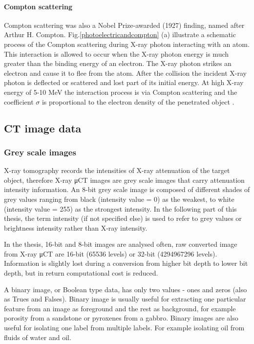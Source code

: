 \paragraph{Compton scattering}
Compton scattering was also a Nobel Prize-awarded (1927) finding, named after Arthur H. Compton. Fig.\ref{photoelectricandcompton} (a) illustrate a schematic process of the Compton scattering during X-ray photon interacting with an atom. This interaction is allowed to occur when the X-ray photon energy is much greater than the binding energy of an electron. The X-ray photon strikes an electron and cause it to flee from the atom. After the collision the incident X-ray photon is deflected or scattered and lost part of its initial energy. At high X-ray energy of 5-10 MeV the interaction process is via Compton scattering and the coefficient $\sigma$ is proportional to the electron density of the penetrated object \citep{wildenschild2013x, hsieh2003computed}. 

\subsection{CT image data}
\subsubsection{Grey scale images}
X-ray tomography records the intensities of X-ray attenuation of the target object, therefore X-ray μCT images are grey scale images that carry attenuation intensity information. An 8-bit grey scale image is composed of different shades of grey values ranging from black (intensity value = 0) as the weakest, to white (intensity value = 255) as the strongest intensity. In the following part of this thesis, the term intensity (if not specified else) is used to refer to grey values or brightness intensity rather than X-ray intensity. 

In the thesis, 16-bit and 8-bit images are analysed often, raw converted image from X-ray μCT are 16-bit (65536 levels) or 32-bit (4294967296 levels). Information is slightly lost during a conversion from higher bit depth to lower bit depth, but in return computational cost is reduced.

A binary image, or Boolean type data, has only two values - ones and zeros (also as Trues and Falses). Binary image is usually useful for extracting one particular feature from an image as foreground and the rest as background, for example porosity from a sandstone or pyroxenes from a gabbro. Binary images are also useful for isolating one label from multiple labels. For example isolating oil from fluids of water and oil.

